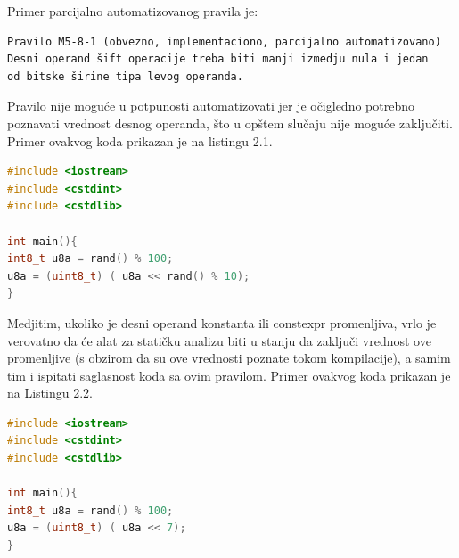 \documentclass[12pt,oneside]{memoir}
\begin{document}
Primer parcijalno automatizovanog pravila je: 
\begin{verbatim}
Pravilo M5-8-1 (obvezno, implementaciono, parcijalno automatizovano) 
Desni operand šift operacije treba biti manji izmedju nula i jedan
od bitske širine tipa levog operanda.
\end{verbatim}
  Pravilo nije moguće u potpunosti automatizovati jer je očigledno potrebno poznavati vrednost desnog operanda, što u opštem slučaju nije
  moguće zaključiti. Primer ovakvog koda prikazan je na listingu 2.1. 
\begin{english}



\begin{lstlisting}[caption={Kod koji ilustruje nemogućnost primene statičke analize},label={lst:label},language=C++, captionpos=b]
#include <iostream>
#include <cstdint>
#include <cstdlib>

int main(){
int8_t u8a = rand() % 100;
u8a = (uint8_t) ( u8a << rand() % 10);
}
\end{lstlisting}
\end{english}
Medjitim, ukoliko je desni operand konstanta ili constexpr promenljiva, vrlo je verovatno da će alat za statičku analizu biti u stanju
  da zaključi vrednost ove promenljive (s obzirom da su ove vrednosti poznate tokom kompilacije), a samim tim i ispitati saglasnost koda sa ovim pravilom.
  Primer ovakvog koda prikazan je na Listingu 2.2.
\begin{english}



\begin{lstlisting}[caption={Kod čija se ispravnost jednostavno može utvrditi statičkom analizom},label={lst:label},language=C++, captionpos=b]
#include <iostream>
#include <cstdint>
#include <cstdlib>

int main(){
int8_t u8a = rand() % 100;
u8a = (uint8_t) ( u8a << 7);
}
\end{lstlisting}
\end{english}
\end{document}

